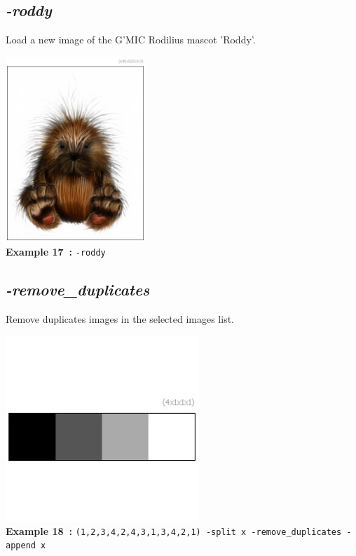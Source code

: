 \documentclass[a4paper,11pt,twoside]{book}
\begin{document}
\subsection{\emph{-roddy} }\vspace*{-0.5em}
Load a new image of the G'MIC Rodilius mascot 'Roddy'.
\begin{center}\includegraphics[keepaspectratio=true,height=7cm,width=\textwidth]{img/gmic_def17.jpg}\\
{\footnotesize \textbf{Example 17~:} \texttt{-roddy}}
\end{center}

\subsection{\emph{-remove\_duplicates} }\vspace*{-0.5em}
Remove duplicates images in the selected images list.
\begin{center}\includegraphics[keepaspectratio=true,height=7cm,width=\textwidth]{img/gmic_def18.jpg}\\
{\footnotesize \textbf{Example 18~:} \texttt{(1,2,3,4,2,4,3,1,3,4,2,1) -split x -remove\_duplicates -append x}}
\end{center}
\end{document}
